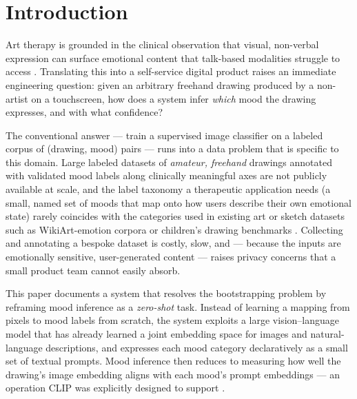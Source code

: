 \documentclass[10pt,twocolumn,letterpaper]{article}
\begin{document}
\section{Introduction}

Art therapy is grounded in the clinical observation that visual, non-verbal expression can surface emotional content that talk-based modalities struggle to access \cite{handdrawn2022}. Translating this into a self-service digital product raises an immediate engineering question: given an arbitrary freehand drawing produced by a non-artist on a touchscreen, how does a system infer \emph{which} mood the drawing expresses, and with what confidence?

The conventional answer --- train a supervised image classifier on a labeled corpus of (drawing, mood) pairs --- runs into a data problem that is specific to this domain. Large labeled datasets of \emph{amateur, freehand} drawings annotated with validated mood labels along clinically meaningful axes are not publicly available at scale, and the label taxonomy a therapeutic application needs (a small, named set of moods that map onto how users describe their own emotional state) rarely coincides with the categories used in existing art or sketch datasets such as WikiArt-emotion corpora or children's drawing benchmarks \cite{handdrawn2022}. Collecting and annotating a bespoke dataset is costly, slow, and --- because the inputs are emotionally sensitive, user-generated content --- raises privacy concerns that a small product team cannot easily absorb.

This paper documents a system that resolves the bootstrapping problem by reframing mood inference as a \emph{zero-shot} task. Instead of learning a mapping from pixels to mood labels from scratch, the system exploits a large vision--language model that has already learned a joint embedding space for images and natural-language descriptions, and expresses each mood category declaratively as a small set of textual prompts. Mood inference then reduces to measuring how well the drawing's image embedding aligns with each mood's prompt embeddings --- an operation CLIP was explicitly designed to support \cite{radford2021clip}.
\end{document}
